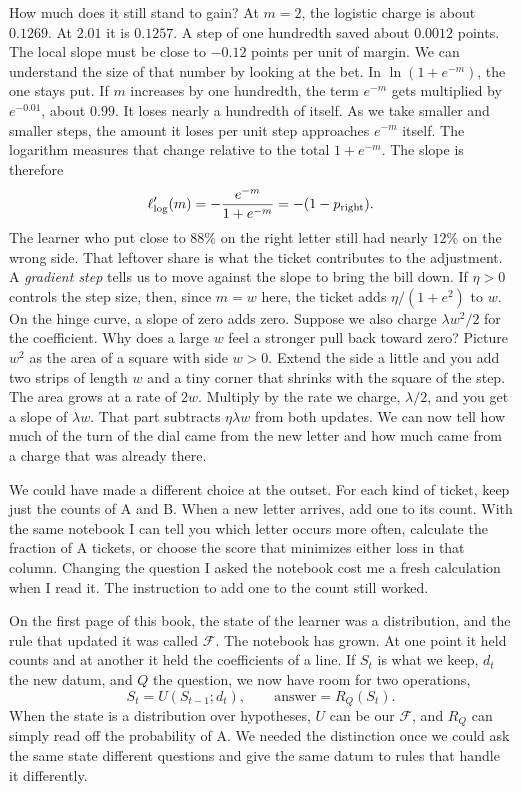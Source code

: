 How much does it still stand to gain? At $m=2$, the logistic charge is about $0.1269$. At $2.01$ it is $0.1257$. A step of one hundredth saved about $0.0012$ points. The local slope must be close to $-0.12$ points per unit of margin. We can understand the size of that number by looking at the bet. In $\ln(1+e^{-m})$, the one stays put. If $m$ increases by one hundredth, the term $e^{-m}$ gets multiplied by $e^{-0.01}$, about $0.99$. It loses nearly a hundredth of itself. As we take smaller and smaller steps, the amount it loses per unit step approaches $e^{-m}$ itself. The logarithm measures that change relative to the total $1+e^{-m}$. The slope is therefore
\[
 \ell'_{\rm log}(m)=-\frac{e^{-m}}{1+e^{-m}}=-(1-p_{\rm right}).
\]
The learner who put close to $88\%$ on the right letter still had nearly $12\%$ on the wrong side. That leftover share is what the ticket contributes to the adjustment. A \emph{gradient step} tells us to move against the slope to bring the bill down. If $\eta>0$ controls the step size, then, since $m=w$ here, the ticket adds $\eta/(1+e^2)$ to $w$. On the hinge curve, a slope of zero adds zero. Suppose we also charge $\lambda w^2/2$ for the coefficient. Why does a large $w$ feel a stronger pull back toward zero? Picture $w^2$ as the area of a square with side $w>0$. Extend the side a little and you add two strips of length $w$ and a tiny corner that shrinks with the square of the step. The area grows at a rate of $2w$. Multiply by the rate we charge, $\lambda/2$, and you get a slope of $\lambda w$. That part subtracts $\eta\lambda w$ from both updates. We can now tell how much of the turn of the dial came from the new letter and how much came from a charge that was already there.

We could have made a different choice at the outset. For each kind of ticket, keep just the counts of A and B. When a new letter arrives, add one to its count. With the same notebook I can tell you which letter occurs more often, calculate the fraction of A tickets, or choose the score that minimizes either loss in that column. Changing the question I asked the notebook cost me a fresh calculation when I read it. The instruction to add one to the count still worked.

On the first page of this book, the state of the learner was a distribution, and the rule that updated it was called $\mathcal F$. The notebook has grown. At one point it held counts and at another it held the coefficients of a line. If $S_t$ is what we keep, $d_t$ the new datum, and $Q$ the question, we now have room for two operations,
\[
        S_t=U(S_{t-1};d_t),\qquad
        \text{answer}=R_Q(S_t).
\]
When the state is a distribution over hypotheses, $U$ can be our $\mathcal F$, and $R_Q$ can simply read off the probability of A. We needed the distinction once we could ask the same state different questions and give the same datum to rules that handle it differently.


